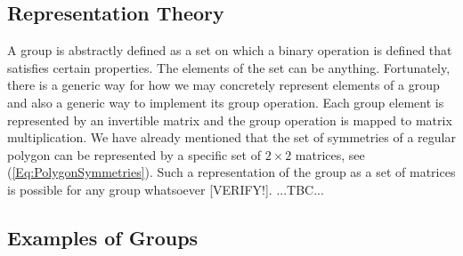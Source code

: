 


\subsection{Representation Theory}
A group is abstractly defined as a set on which a binary operation is defined that satisfies certain properties. The elements of the set can be anything. Fortunately, there is a generic way for how we may concretely represent elements of a group and also a generic way to implement its group operation. Each group element is represented by an invertible matrix and the group operation is mapped to matrix multiplication. We have already mentioned that the set of symmetries of a regular polygon can be represented by a specific set of $2 \times 2$ matrices, see (\ref{Eq:PolygonSymmetries}). Such a representation of the group as a set of matrices is possible for any group whatsoever [VERIFY!]. ...TBC...






\subsection{Examples of Groups}


